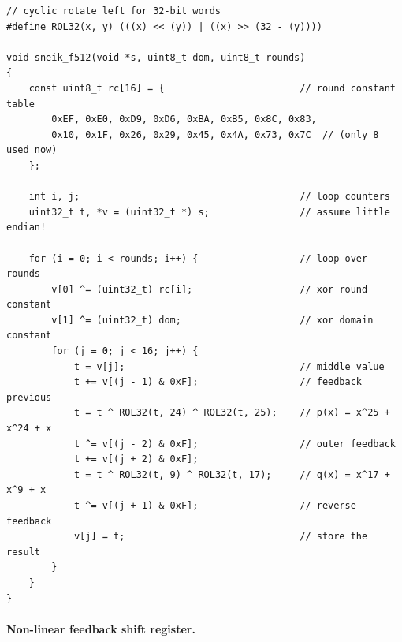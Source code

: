 \documentclass{iacrtrans}
\newcommand{\msf}[1]{\mathsf{#1}}
\begin{document}
\begin{lstlisting}[float, label=lst:f512,
	caption={The SNEIK permutation  
	$\msf{f512}^\rho_\delta(\msf{S})$ in C. We set $\msf{dom} = \delta$
	and $\msf{rounds}=\rho$.}]
// cyclic rotate left for 32-bit words
#define ROL32(x, y) (((x) << (y)) | ((x) >> (32 - (y))))

void sneik_f512(void *s, uint8_t dom, uint8_t rounds)
{
	const uint8_t rc[16] = {						// round constant table
		0xEF, 0xE0, 0xD9, 0xD6, 0xBA, 0xB5, 0x8C, 0x83,
		0x10, 0x1F, 0x26, 0x29, 0x45, 0x4A, 0x73, 0x7C	// (only 8 used now)
	};

	int i, j;										// loop counters
	uint32_t t, *v = (uint32_t *) s;				// assume little endian!

	for (i = 0; i < rounds; i++) {					// loop over rounds
		v[0] ^= (uint32_t) rc[i];					// xor round constant
		v[1] ^= (uint32_t) dom;						// xor domain constant
		for (j = 0; j < 16; j++) {
			t = v[j];								// middle value
			t += v[(j - 1) & 0xF];					// feedback previous
			t = t ^ ROL32(t, 24) ^ ROL32(t, 25); 	// p(x) = x^25 + x^24 + x
			t ^= v[(j - 2) & 0xF];					// outer feedback
			t += v[(j + 2) & 0xF];
			t = t ^ ROL32(t, 9) ^ ROL32(t, 17);		// q(x) = x^17 + x^9 + x
			t ^= v[(j + 1) & 0xF];					// reverse feedback
			v[j] = t;								// store the result
		}
	}
}
\end{lstlisting}	

	\paragraph{Non-linear feedback shift register.}
\end{document}

